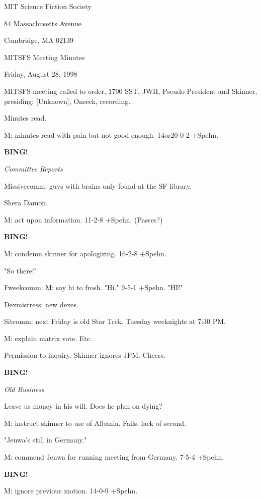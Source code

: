 \documentclass[12pt]{article}
\newcommand{\bing}{{\bf BING!} }
\newcommand{\goto}[1]{\bing \vskip 12pt \centerline{{\em{#1}}}}
\begin{document}
\begin{center}

MIT Science Fiction Society 

84 Massachusetts Avenue

Cambridge, MA 02139

\vspace{12pt}

MITSFS Meeting Minutes 

Friday, August 28, 1998

\end{center}
 
\vspace{18pt}

\setlength{\parskip}{6pt}

\noindent
MITSFS meeting called to order, 1700 SST,
JWH, Pseudo-President and Skinner, presiding; [Unknown], Onseck, recording.

Minutes read.

M: minutes read with pain but not good enough. 14or20-0-2 +Spehn.

\goto{Committee Reports}

Missivecomm: guys with brains only found at the SF library.

Shera Damon.

M: act upon information. 11-2-8 +Spehn. (Passes?)

\bing

M: condemn skinner for apologizing. 16-2-8 +Spehn.

"So there!"

Fweekcomm: M: say hi to frosh. "Hi." 9-5-1 +Spehn. "HI!"

Dexmistress: new dexes.

Sitcomm: next Friday is old Star Trek. Tuesday weeknights at 7:30 PM.

M: explain matrix vote. Etc.

Permission to inquiry. Skinner ignores JPM. Cheers.

\goto{Old Business}

Leave us money in his will. Does he plan on dying?

M: instruct skinner to use of Albania. Fails, lack of second.

"Jenwa's still in Germany."

M: commend Jenwa for running meeting from Germany. 7-5-4 +Spehn.

\bing

M: ignore previous motion. 14-0-9 +Spehn.
\end{document}
